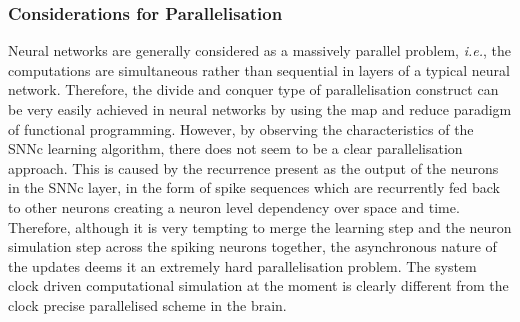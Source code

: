 \subsubsection{Considerations for Parallelisation}
Neural networks are generally considered as a massively parallel problem, \emph{i.e.}, the computations are simultaneous rather than sequential in layers of a typical neural network. Therefore, the divide and conquer type of parallelisation construct can be very easily achieved in neural networks by using the map and reduce paradigm of functional programming. However, by observing the characteristics of the SNNc learning algorithm, there does not seem to be a clear parallelisation approach. This is caused by the recurrence present as the output of the neurons in the SNNc layer, in the form of spike sequences which are recurrently fed back to other neurons creating a neuron level dependency over space and time. Therefore, although it is very tempting to merge the learning step and the neuron simulation step across the spiking neurons together, the asynchronous nature of the updates deems it an extremely hard parallelisation problem. The system clock driven computational simulation at the moment is clearly different from the clock precise parallelised scheme in the brain.    

